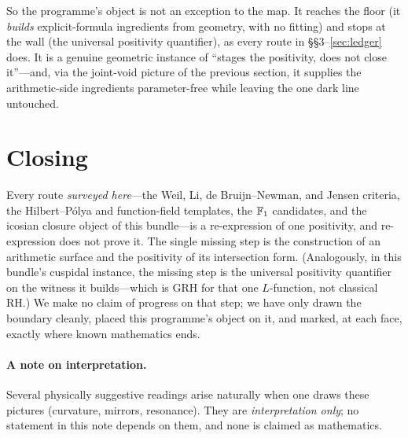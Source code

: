 \documentclass[11pt]{article}
\begin{document}
\noindent So the programme's object is not an exception to the map. It reaches the floor
(it \emph{builds} explicit-formula ingredients from geometry, with no fitting) and stops
at the wall (the universal positivity quantifier), as every route in
\S\S3--\ref{sec:ledger} does. It is a genuine geometric instance of ``stages the
positivity, does not close it''---and, via the joint-void picture of the previous
section, it supplies the arithmetic-side ingredients parameter-free while leaving the
one dark line untouched.

\section{Closing}
Every route \emph{surveyed here}---the Weil, Li, de Bruijn--Newman, and Jensen criteria,
the Hilbert--P\'olya and function-field templates, the $\mathbb{F}_1$ candidates, and the icosian
closure object of this bundle---is a re-expression of one positivity, and
re-expression does not prove it. The single missing step is the construction of an
arithmetic surface and the positivity of its intersection form. (Analogously, in this
bundle's cuspidal instance, the missing step is the universal positivity quantifier on
the witness it builds---which is GRH for that one $L$-function, not classical RH.) We make
no claim of progress on that step; we have only drawn the boundary cleanly, placed this
programme's object on it, and marked, at each face, exactly where known mathematics ends.

\paragraph{A note on interpretation.} Several physically suggestive readings arise
naturally when one draws these pictures (curvature, mirrors, resonance). They are
\emph{interpretation only}; no statement in this note depends on them, and none is
claimed as mathematics.
\end{document}

